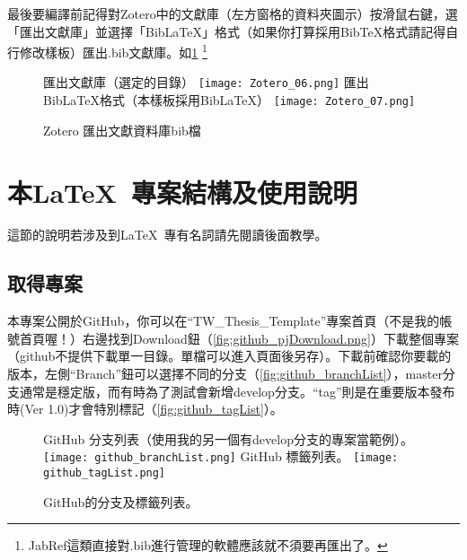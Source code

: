 \documentclass[class=NCU_thesis, crop=false, float=true]{standalone}
\begin{document}
最後要編譯前記得對Zotero中的文獻庫（左方窗格的資料夾圖示）按滑鼠右鍵，選「匯出文獻庫」並選擇「BibLaTeX」格式（如果你打算採用BibTeX格式請記得自行修改樣板）匯出.bib文獻庫。如\cref{fig:zotero_exportBib}
\footnote{JabRef這類直接對.bib進行管理的軟體應該就不須要再匯出了。}
\begin{figure}
    \centering
    \subcaptionbox
        {匯出文獻庫（選定的目錄）
        \label{fig:Zotero_06}}
        {\texttt{[image: Zotero\_06.png]}}
    \hspace{2em}
    \subcaptionbox
        {匯出BibLaTeX格式（本樣板採用BibLaTeX）
        \label{fig:Zotero_07}}
        {\texttt{[image: Zotero\_07.png]}}
    \caption{Zotero 匯出文獻資料庫bib檔}
    \label{fig:zotero_exportBib}
\end{figure}

\section{本\LaTeX\ 專案結構及使用說明}
這節的說明若涉及到\LaTeX\ 專有名詞請先閱讀後面教學。
\subsection{取得專案}
本專案公開於GitHub，你可以在``TW\_Thesis\_Template''專案首頁\cite{_sppmg/tw_thesis_template_????}（不是我的帳號首頁喔！）右邊找到Download鈕（\cref{fig:github_pjDownload.png}）下載整個專案（github不提供下載單一目錄。單檔可以進入頁面後另存）。下載前確認你要載的版本，左側``Branch''鈕可以選擇不同的分支（\cref{fig:github_branchList}），master分支通常是穩定版，而有時為了測試會新增develop分支。``tag''則是在重要版本發布時(Ver 1.0)才會特別標記（\cref{fig:github_tagList}）。
\begin{figure}
    \centering
    \subcaptionbox
        {GitHub 分支列表（使用我的另一個有develop分支的專案當範例）。
        \label{fig:github_branchList}}
        {\texttt{[image: github\_branchList.png]}}
    \hspace{3em}
    \subcaptionbox
        {GitHub 標籤列表。
        \label{fig:github_tagList}}
        {\texttt{[image: github\_tagList.png]}}
    \caption{GitHub的分支及標籤列表。}
    \label{fig:github_branch_tagList}
\end{figure}
\end{document}
